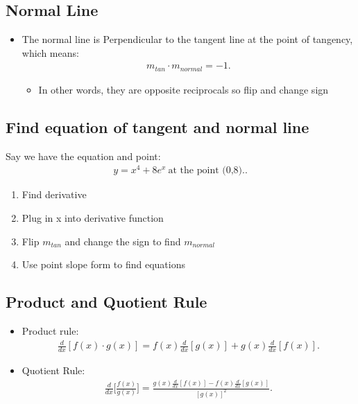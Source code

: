\documentclass{report}
\begin{document}
    \bigbreak \noindent \bigbreak \noindent 
    \subsection{Normal Line}
    \begin{itemize}
      \item The normal line is Perpendicular to the tangent line at the point of tangency, which means:
        \begin{align*}
          m_{tan} \cdot m_{normal} = -1
        .\end{align*}
        \begin{itemize}
          \item In other words, they are opposite reciprocals so flip and change sign
        \end{itemize}
    \end{itemize}

    \bigbreak \noindent \bigbreak \noindent 
    \subsection{Find equation of tangent and normal line}
    \bigbreak \noindent \bigbreak \noindent
    Say we have the equation and point:
    \begin{align*}
      y=x^4 + 8e^x\ \text{at the point (0,8).}
    .\end{align*}
    \begin{enumerate}
      \item Find derivative
      \item Plug in x into derivative function
      \item Flip $m_{tan}$ and change the sign to find $m_{normal} $
      \item Use point slope form to find equations
    \end{enumerate}


    \bigbreak \noindent \bigbreak \noindent 
    \subsection{Product and Quotient Rule}
    \begin{itemize}
      \item Product rule:
        \begin{align*}
          \frac{d}{dx}[f(x) \cdot g(x)] = f(x) \frac{d}{dx}[g(x)] + g(x) \frac{d}{dx}[f(x)]
        .\end{align*}
      \item Quotient Rule:
        \begin{align*}
          \frac{d}{dx}\bigg[ \frac{f(x)}{g(x)}\bigg] = \frac{g(x) \frac{d}{dx}[f(x)] - f(x) \frac{d}{dx}[g(x)]}{[g(x)]^2}
        .\end{align*}
    \end{itemize}
\end{document}
